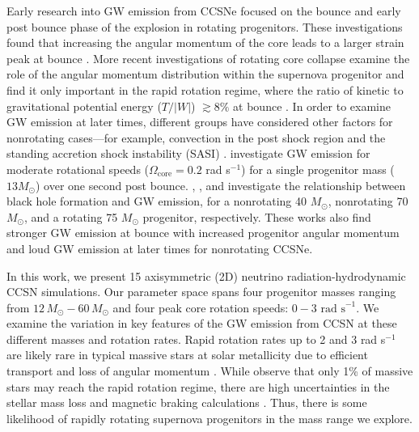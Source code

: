 \documentclass[twocolumn,times]{aastex62}  %
\begin{document}
Early research into GW emission from CCSNe focused on the bounce and early post bounce phase of the explosion in rotating progenitors.
These investigations found that increasing the angular momentum of the core leads to a larger strain peak at bounce \citep{muller:1982,moench:1991,yamada:1995,zwerger:1997,dimm:2002,kotake:2003,shibata:2004}.  
More recent investigations of rotating core collapse examine the role of the angular momentum distribution within the supernova progenitor and find it only important in the rapid rotation regime, where the ratio of kinetic to gravitational potential energy ($T/|W|$) $ \gtrsim 8\%$ at bounce \citep{abdik:2014}. In order to examine GW emission at later times, different groups have considered other factors for nonrotating cases---for example, convection in the post shock region \citep{burrows:1996,muller:1997,muller:2004,murphy:2009,marek:2009b} and the standing accretion shock instability (SASI) \citep{blondin:2003,blondin:2006,ohnishi:2006,foglizzo:2007,scheck:2008,iwakami:2009,fernandez:2010}.  \citet{moro:2018} investigate GW emission for moderate rotational speeds ($\Omega_{\mathrm{core}} = 0.2$ rad s$^{-1}$) for a single progenitor mass ($13 M_\odot$) over one second post bounce.  \citet{pan:2018}, \citet{kuroda:2018}, and \citet{ott:2011} investigate the relationship between black hole formation and GW emission, for a nonrotating 40 $M_\odot$, nonrotating  70 $M_\odot$, and  a rotating 75 $M_\odot$ progenitor, respectively.  These works also find stronger GW emission at bounce with increased progenitor angular momentum and loud GW emission at later times for nonrotating CCSNe.
 

In this work, we present 15 axisymmetric (2D) neutrino radiation-hydrodynamic CCSN simulations.  
Our parameter space spans four progenitor masses ranging from $12\,M_\odot-60\,M_\odot$ \citep{Suk:2016} and four peak core rotation speeds: $0-3 \text{ rad s}^{-1}$.  
We examine the variation in key features of the GW emission from CCSN at these different masses and rotation rates.
Rapid rotation rates up to 2 and 3 rad s$^{-1}$ are likely rare in typical massive stars at solar metallicity due to efficient transport and loss of angular momentum \citep{heger:2005}.
While \citet{woosley:2006} observe that only 1\% of massive stars may reach the rapid rotation regime, there are high uncertainties in the stellar mass loss and magnetic braking calculations \citep{smith:2014}.  Thus, there is some likelihood of rapidly rotating supernova progenitors in the mass range we explore.  
\end{document}
